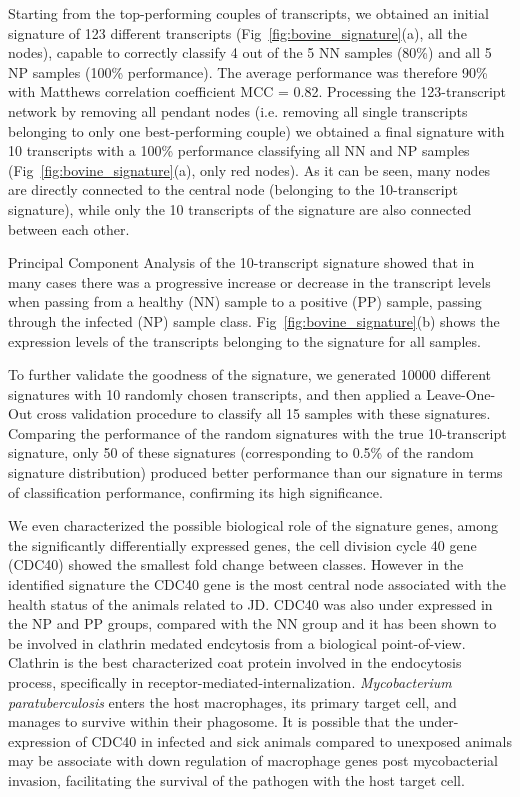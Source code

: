 \documentclass{standalone}
\begin{document}
Starting from the top-performing couples of transcripts, we obtained an initial signature of 123 different transcripts (Fig~\ref{fig:bovine_signature}(a), all the nodes), capable to correctly classify 4 out of the 5 NN samples (80\%) and all 5 NP samples (100\% performance).
The average performance was therefore 90\% with Matthews correlation coefficient MCC = 0.82.
Processing the 123-transcript network by removing all pendant nodes (i.e. removing all single transcripts belonging to only one best-performing couple) we obtained a final signature with 10 transcripts with a 100\% performance classifying all NN and NP samples (Fig~\ref{fig:bovine_signature}(a), only red nodes).
As it can be seen, many nodes are directly connected to the central node (belonging to the 10-transcript signature), while only the 10 transcripts of the signature are also connected between each other.

Principal Component Analysis of the 10-transcript signature showed that in many cases there was a progressive increase or decrease in the transcript levels when passing from a healthy (NN) sample to a positive (PP) sample, passing through the infected (NP) sample class.
Fig~\ref{fig:bovine_signature}(b) shows the expression levels of the transcripts belonging to the signature for all samples.

To further validate the goodness of the signature, we generated 10000 different signatures with 10 randomly chosen transcripts, and then applied a Leave-One-Out cross validation procedure to classify all 15 samples with these signatures.
Comparing the performance of the random signatures with the true 10-transcript signature, only 50 of these signatures (corresponding to 0.5\% of the random signature distribution) produced better performance than our signature in terms of classification performance, confirming its high significance.

We even characterized the possible biological role of the signature genes, among the significantly differentially expressed genes, the cell division cycle 40 gene (CDC40) showed the smallest fold change between classes.
However in the identified signature the CDC40 gene is the most central node associated with the health status of the animals related to JD.
CDC40 was also under expressed in the NP and PP groups, compared with the NN group and it has been shown to be involved in clathrin medated endcytosis from a biological point-of-view.
Clathrin is the best characterized coat protein involved in the endocytosis process, specifically in receptor-mediated-internalization.
\emph{Mycobacterium paratuberculosis} enters the host macrophages, its primary target cell, and manages to survive within their phagosome.
It is possible that the under-expression of CDC40 in infected and sick animals compared to unexposed animals may be associate with down regulation of macrophage genes post mycobacterial invasion, facilitating the survival of the pathogen with the host target cell.
\end{document}
